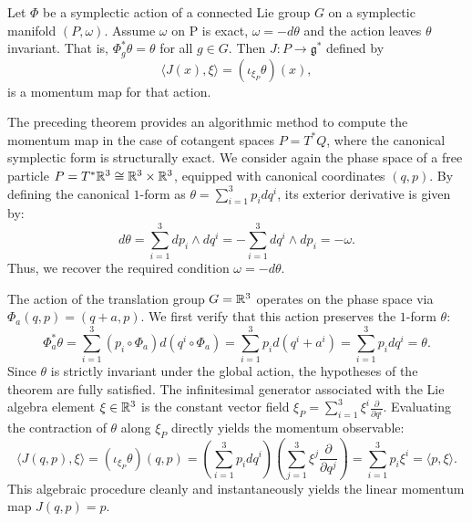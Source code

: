 \begin{theorem}
	Let $\Phi$ be a symplectic action of a connected Lie group $G$ on a symplectic manifold $(P, \omega)$. Assume $\omega$ on P is exact, $\omega = -d\theta$ and the action leaves $\theta$ invariant. That is, $\Phi^*_g \theta = \theta$ for all $g \in G$. Then $J: P \to \mathfrak{g}^*$ defined by 
	\[
	\langle J(x),  \xi \rangle= (\iota_{\xi_P} \theta)(x),
	\]
	is a momentum map for that action.
\end{theorem}

\begin{example}
	The preceding theorem provides an algorithmic method to compute the momentum map in the case of cotangent spaces $P = T^*Q$, where the canonical symplectic form is structurally exact. We consider again the phase space of a free particle $P = T^*\mathbb{R}^3 \cong \mathbb{R}^3 \times \mathbb{R}^3$, equipped with canonical coordinates $(q, p)$. By defining the canonical $1$-form as $\theta = \sum_{i=1}^3 p_i dq^i$, its exterior derivative is given by:
	\begin{equation}
		d\theta = \sum_{i=1}^3 dp_i \wedge dq^i = -\sum_{i=1}^3 dq^i \wedge dp_i = -\omega.
	\end{equation}
	Thus, we recover the required condition $\omega = -d\theta$.
	
	\noindent The action of the translation group $G = \mathbb{R}^3$ operates on the phase space via $\Phi_a(q, p) = (q + a, p)$. We first verify that this action preserves the $1$-form $\theta$:
	\begin{equation}
		\Phi_a^*\theta = \sum_{i=1}^3 (p_i \circ \Phi_a) d(q^i \circ \Phi_a) = \sum_{i=1}^3 p_i d(q^i + a^i) = \sum_{i=1}^3 p_i dq^i = \theta.
	\end{equation}
	Since $\theta$ is strictly invariant under the global action, the hypotheses of the theorem are fully satisfied. The infinitesimal generator associated with the Lie algebra element $\xi \in \mathbb{R}^3$ is the constant vector field $\xi_P = \sum_{i=1}^3 \xi^i \frac{\partial}{\partial q^i}$. Evaluating the contraction of $\theta$ along $\xi_P$ directly yields the momentum observable:
	\begin{equation}
		\langle J(q, p) , \xi \rangle = (\iota_{\xi_P}\theta)(q, p) = \left( \sum_{i=1}^3 p_i dq^i \right) \left( \sum_{j=1}^3 \xi^j \frac{\partial}{\partial q^j} \right) = \sum_{i=1}^3 p_i \xi^i = \langle p, \xi \rangle.
	\end{equation}
	This algebraic procedure cleanly and instantaneously yields the linear momentum map $J(q, p) = p$.
\end{example}


